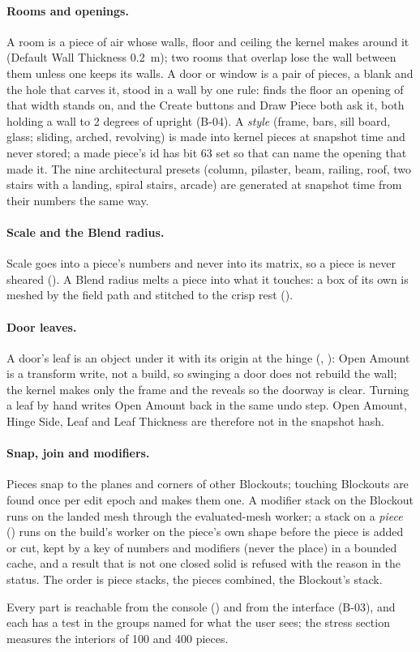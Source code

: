 \paragraph{Rooms and openings.} A room is a piece of air whose walls, floor and ceiling the kernel makes around it
(Default Wall Thickness 0.2~m); two rooms that overlap lose the wall between them unless one keeps its walls. A door or
window is a pair of pieces, a blank and the hole that carves it, stood in a wall by one rule: 
finds the floor an opening of that width stands on, and the Create buttons and Draw Piece both ask it, both holding a wall
to 2 degrees of upright (B-04). A \emph{style} (frame, bars, sill board, glass; sliding, arched, revolving) is made into
kernel pieces at snapshot time and never stored; a made piece's id has bit 63 set so that
 can name the opening that made it. The nine architectural presets (column, pilaster, beam,
railing, roof, two stairs with a landing, spiral stairs, arcade) are generated at snapshot time from their numbers the
same way.

\paragraph{Scale and the Blend radius.} Scale goes into a piece's numbers and never into its matrix, so a piece is never
sheared (). A Blend radius melts a piece into what it touches: a box of its own is meshed by the field path and
stitched to the crisp rest ().

\paragraph{Door leaves.} A door's leaf is an object under it with its origin at the hinge (,
): Open Amount is a transform write, not a build, so swinging a door does not rebuild the wall; the kernel
makes only the frame and the reveals so the doorway is clear. Turning a leaf by hand writes Open Amount back in the same
undo step. Open Amount, Hinge Side, Leaf and Leaf Thickness are therefore not in the snapshot hash.

\paragraph{Snap, join and modifiers.} Pieces snap to the planes and corners of other Blockouts; touching Blockouts are found
once per edit epoch and  makes them one. A modifier stack on the Blockout runs on the landed mesh through
the evaluated-mesh worker; a stack on a \emph{piece} () runs on the build's worker on the piece's own shape before
the piece is added or cut, kept by a key of numbers and modifiers (never the place) in a bounded cache, and a result that is
not one closed solid is refused with the reason in the status. The order is piece stacks, the pieces combined, the
Blockout's stack.

Every part is reachable from the console () and from the
interface (B-03), and each has a test in the  groups named for what the user sees; the stress section
 measures the interiors of 100 and 400 pieces.
